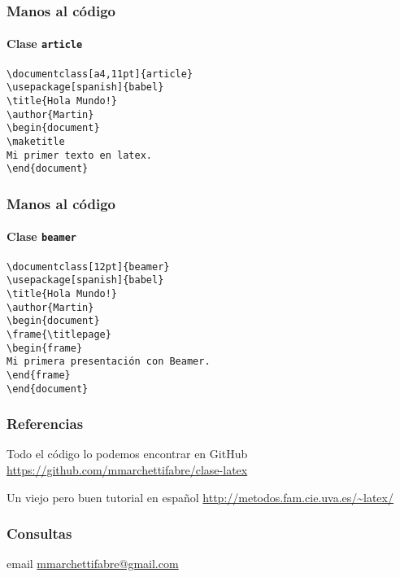 \documentclass[12pt]{beamer}
\begin{document}
\begin{frame}%
  \frametitle{Manos al código}
  \framesubtitle{Clase \texttt{article}}
  \begin{block}{}
    \texttt{\textbackslash documentclass[a4,11pt]\{article\}\\
      \textbackslash usepackage[spanish]\{babel\}\\
      \bigskip
      \textbackslash title\{Hola Mundo!\}\\
      \textbackslash author\{Martin\}\\
      \bigskip
      \textbackslash begin\{document\}\\
      \textbackslash maketitle\\
      \bigskip
      Mi primer texto en latex.\\
      \bigskip
      \textbackslash end\{document\}
    }
\end{block}
\end{frame}

\begin{frame}%
  \frametitle{Manos al código}
  \framesubtitle{Clase \texttt{beamer}}
  \begin{block}{}
    \texttt{\textbackslash documentclass[12pt]\{beamer\}\\
      \textbackslash usepackage[spanish]\{babel\}\\
      \bigskip
      \textbackslash title\{Hola Mundo!\}\\
      \textbackslash author\{Martin\}\\
      \bigskip
      \textbackslash begin\{document\}\\
      \textbackslash frame\{\textbackslash titlepage\}\\
      \bigskip
      \textbackslash begin\{frame\}\\
      Mi primera presentación con Beamer.\\
      \textbackslash end\{frame\}\\
      \bigskip
      \textbackslash end\{document\}
    }
\end{block}
\end{frame}

\begin{frame}%
  \frametitle{Referencias}
  \begin{block}{Todo el código lo podemos encontrar en GitHub}
    \url{https://github.com/mmarchettifabre/clase-latex}
  \end{block}
  \begin{block}{Un viejo pero buen tutorial en español}
    \url{http://metodos.fam.cie.uva.es/~latex/}
  \end{block}
\end{frame}

\begin{frame}%
  \frametitle{Consultas}
  \begin{block}{email}
    \href{mailto:mmarchettifabre@gmail.com}{mmarchettifabre@gmail.com}
  \end{block}
\end{frame}
\end{document}
